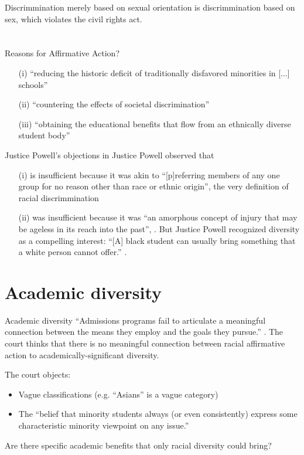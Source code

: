 \documentclass[ignorenonframetext, aspectratio=169]{beamer}
\newcommand{\nopage}{\_\_\_\_}
\begin{document}
Discrimmination merely based on sexual orientation is discrimmination based on sex, which violates the civil rights act. 

\section{}

\begin{frame}{Reasons for Affirmative Action?}
\begin{enumerate}
	\item[(i)] ``reducing the historic deficit of traditionally disfavored minorities in [...] schools''
	\item[(ii)] ``countering the effects of societal discrimination''
	\item[(iii)] ``obtaining the educational benefits that flow from an ethnically diverse student body''
\end{enumerate}
\end{frame}

\begin{frame}{Justice Powell's objections in }
Justice Powell observed that
\begin{enumerate}
	\item[(i)] is insufficient because it was akin to ``[p]referring members of any one group for no reason other than race or ethnic origin'', the very definition of racial discrimmination
	\item[(ii)] was insufficient because it was ``an amorphous concept of injury that may be ageless in its reach into the past'', . But Justice Powell recognized diversity as a compelling interest: ``[A] black student can usually bring something that a white person cannot offer.'' .
\end{enumerate}
\end{frame}

\section{Academic diversity}

\begin{frame}{Academic diversity}
``Admissions programs fail to articulate a meaningful connection between the means they employ and the goals they pursue.'' \Runcite[\nopage{} (slip op.\ 24)]{harvard}. The court thinks that there is no meaningful connection between racial affirmative action to academically-significant diversity.

The court objects:
\begin{itemize}
	\item Vague classifications (e.g. ``Asians'' is a vague category)
	\item The ``belief that minority students always (or even consistently) express some characteristic minority viewpoint on any issue.''
\end{itemize}
Are there specific academic benefits that only racial diversity could bring?
\end{frame}
\end{document}
